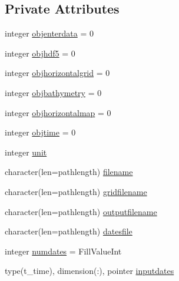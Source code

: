 \subsection*{Private Attributes}
\begin{DoxyCompactItemize}
\item 
integer \mbox{\hyperlink{structmoduletecnoceanascii_1_1t__tecnoceanascii_ab21480e3607ea386feba1fb86eed5f03}{objenterdata}} = 0
\item 
integer \mbox{\hyperlink{structmoduletecnoceanascii_1_1t__tecnoceanascii_aa6d3698732eec03eba6b3955d177fb12}{objhdf5}} = 0
\item 
integer \mbox{\hyperlink{structmoduletecnoceanascii_1_1t__tecnoceanascii_a4f08b02d9cec137d1c3fd77594392d70}{objhorizontalgrid}} = 0
\item 
integer \mbox{\hyperlink{structmoduletecnoceanascii_1_1t__tecnoceanascii_a98c2a57548a985ba9b214a89de0c0749}{objbathymetry}} = 0
\item 
integer \mbox{\hyperlink{structmoduletecnoceanascii_1_1t__tecnoceanascii_ad127c944046f5f9b5706788dce0fe550}{objhorizontalmap}} = 0
\item 
integer \mbox{\hyperlink{structmoduletecnoceanascii_1_1t__tecnoceanascii_aa2cdfca1b4aed97f44e7e0a25bffbb1f}{objtime}} = 0
\item 
integer \mbox{\hyperlink{structmoduletecnoceanascii_1_1t__tecnoceanascii_a685867096cdf6bde4dea79fcef1b71c8}{unit}}
\item 
character(len=pathlength) \mbox{\hyperlink{structmoduletecnoceanascii_1_1t__tecnoceanascii_aeef5cadf34545a89a3477c935f2b533f}{filename}}
\item 
character(len=pathlength) \mbox{\hyperlink{structmoduletecnoceanascii_1_1t__tecnoceanascii_aff9bdcf23dc959df2f2896a7a18d29b1}{gridfilename}}
\item 
character(len=pathlength) \mbox{\hyperlink{structmoduletecnoceanascii_1_1t__tecnoceanascii_ad7dfc4e176a2fba61ea5313e6f63ce71}{outputfilename}}
\item 
character(len=pathlength) \mbox{\hyperlink{structmoduletecnoceanascii_1_1t__tecnoceanascii_a4a1e1a6286a607bcd334440276295baa}{datesfile}}
\item 
integer \mbox{\hyperlink{structmoduletecnoceanascii_1_1t__tecnoceanascii_af020f2c12fdb345bb4ec0bfaf803a798}{numdates}} = Fill\+Value\+Int
\item 
type(t\+\_\+time), dimension(\+:), pointer \mbox{\hyperlink{structmoduletecnoceanascii_1_1t__tecnoceanascii_a1788c7279d0845a7bc17bb478a2621aa}{inputdates}}

\end{DoxyCompactItemize}
